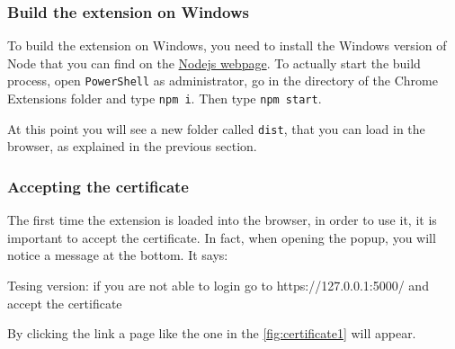 \subsubsection{Build the extension on Windows}

To build the extension on Windows, you need to install the Windows version of Node that you can find on the \href{https://nodejs.org/}{Nodejs webpage}. 
To actually start the build process, open \texttt{PowerShell} as administrator, go in the directory of the Chrome Extensions folder and type \texttt{npm i}. Then type \texttt{npm start}.

At this point you will see a new folder called \texttt{dist}, that you can load in the browser, as explained in the previous section.

\subsubsection{Accepting the certificate}
\label{sec:accept_certificate}
The first time the extension is loaded into the browser, in order to use it, it is important to accept the certificate. In fact, when opening the popup, you will notice a message at the bottom. It says:

\begin{warning}
	Tesing version: if you are not able to login go to https://127.0.0.1:5000/ and accept the certificate
\end{warning}
By clicking the link a page like the one in the \autoref{fig:certificate1}  will appear. 

